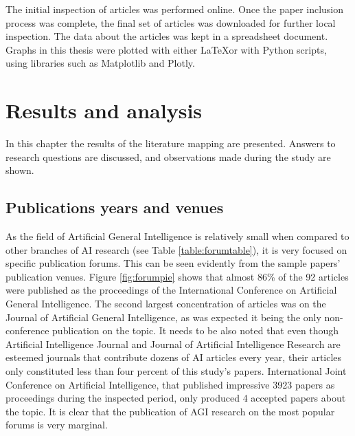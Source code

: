 \documentclass[utf8,english]{gradu3}
\begin{document}
The initial inspection of articles was performed online. Once the paper
inclusion process was complete, the final set of articles was downloaded for
further local inspection. The data about the articles was kept in a spreadsheet
document. Graphs in this thesis were plotted with either \LaTeX or with Python
scripts, using libraries such as Matplotlib and Plotly.


\chapter{Results and analysis}
\label{chap:results}

 In this chapter the results of the literature mapping are presented. Answers to
 research questions are discussed, and observations made during the study are
 shown. 

 \section{Publications years and venues}

 As the field of Artificial General Intelligence is relatively small when
 compared to other branches of AI research (see Table \ref{table:forumtable}), it is
 very focused on specific publication forums. This can be seen evidently from
 the sample papers' publication venues. Figure \ref*{fig:forumpie} shows that
 almost 86\% of the 92 articles were published as the proceedings of the
 International Conference on Artificial General Intelligence. The second largest
 concentration of articles was on the Journal of Artificial General
 Intelligence, as was expected it being the only non-conference publication on
 the topic. It needs to be also noted that even though Artificial Intelligence
 Journal and Journal of Artificial Intelligence Research are esteemed journals
 that contribute dozens of AI articles every year, their articles only
 constituted less than four percent of this study's papers. International Joint
 Conference on Artificial Intelligence, that published impressive 3923 papers as
 proceedings during the inspected period, only produced 4 accepted papers about
 the topic. It is clear that the publication of AGI research on the most popular
 forums is very marginal.
\end{document}
